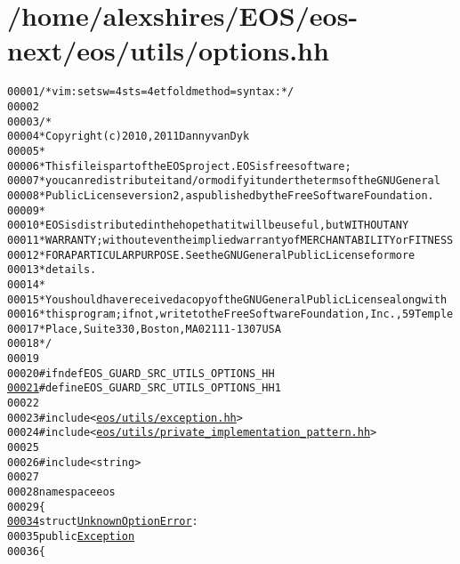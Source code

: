 \hypertarget{options_8hh_source}{
\section{/home/alexshires/EOS/eos-\/next/eos/utils/options.hh}
}


\begin{footnotesize}\begin{alltt}
00001 \textcolor{comment}{/* vim: set sw=4 sts=4 et foldmethod=syntax : */}
00002 
00003 \textcolor{comment}{/*}
00004 \textcolor{comment}{ * Copyright (c) 2010, 2011 Danny van Dyk}
00005 \textcolor{comment}{ *}
00006 \textcolor{comment}{ * This file is part of the EOS project. EOS is free software;}
00007 \textcolor{comment}{ * you can redistribute it and/or modify it under the terms of the GNU General}
00008 \textcolor{comment}{ * Public License version 2, as published by the Free Software Foundation.}
00009 \textcolor{comment}{ *}
00010 \textcolor{comment}{ * EOS is distributed in the hope that it will be useful, but WITHOUT ANY}
00011 \textcolor{comment}{ * WARRANTY; without even the implied warranty of MERCHANTABILITY or FITNESS}
00012 \textcolor{comment}{ * FOR A PARTICULAR PURPOSE.  See the GNU General Public License for more}
00013 \textcolor{comment}{ * details.}
00014 \textcolor{comment}{ *}
00015 \textcolor{comment}{ * You should have received a copy of the GNU General Public License along with}
00016 \textcolor{comment}{ * this program; if not, write to the Free Software Foundation, Inc., 59 Temple}
00017 \textcolor{comment}{ * Place, Suite 330, Boston, MA  02111-1307  USA}
00018 \textcolor{comment}{ */}
00019 
00020 \textcolor{preprocessor}{#ifndef EOS\_GUARD\_SRC\_UTILS\_OPTIONS\_HH}
\hypertarget{options_8hh_source_l00021}{}\hyperlink{options_8hh_a272d2c4d81b3724465284b8966de0f2c}{00021} \textcolor{preprocessor}{}\textcolor{preprocessor}{#define EOS\_GUARD\_SRC\_UTILS\_OPTIONS\_HH 1}
00022 \textcolor{preprocessor}{}
00023 \textcolor{preprocessor}{#include <\hyperlink{exception_8hh}{eos/utils/exception.hh}>}
00024 \textcolor{preprocessor}{#include <\hyperlink{private__implementation__pattern_8hh}{eos/utils/private_implementation_pattern.hh}>}
00025 
00026 \textcolor{preprocessor}{#include <string>}
00027 
00028 \textcolor{keyword}{namespace }eos
00029 \{
\hypertarget{options_8hh_source_l00034}{}\hyperlink{structeos_1_1UnknownOptionError}{00034}     \textcolor{keyword}{struct }\hyperlink{structeos_1_1UnknownOptionError}{UnknownOptionError} :
00035         \textcolor{keyword}{public} \hyperlink{classeos_1_1Exception}{Exception}
00036     \{

\end{alltt}
\end{footnotesize}
